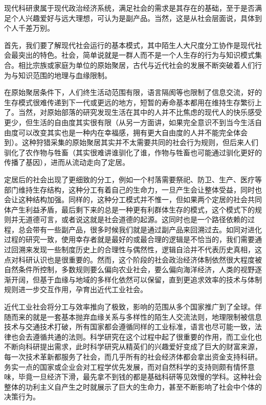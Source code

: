 \documentclass[]{tufte-book}
\begin{document}
现代科研隶属于现代政治经济系统，满足社会的需求是其存在的基础，至于是否满足个人兴趣爱好与远大理想，可认为是副产品。当然，这是从社会层面说，具体到个人千差万别。

首先，我们要了解现代社会运行的基本模式，其中陌生人大尺度分工协作是现代社会最突出的特色。社会，简单说就是一群人而不是一个人生存的行为与知识模式集合。相比宗族或家庭为单位的原始聚居，古代与近代社会的发展不断突破着人们行为与知识范围的地理与血缘限制。

在原始聚居条件下，人们终生活动范围有限，语言隔阂等也限制了信息交流，好的生存模式很难传递到下一代或更远的地方，短暂的寿命基本都用在维持生存繁衍上了。当然，对原始部落的研究发现生活在其中的人并不比焦虑的现代人的快乐感受更少，但生活的自由度其实很有限（从另一方面讲，如果完全意识不到当今生活自由度可以改变其实也是一种内在幸福感，拥有更大自由度的人并不能完全体会到）。这种狩猎采集的原始聚居其实并不太需要共同的社会行为规则，但后来人们驯化了农作物与牲畜（其实很难讲谁驯化了谁，作物与牲畜也可能通过驯化更好的传播了基因），进而从流动走向了定居。

定居后的社会出现了更细致的分工，例如一个村落需要祭祀、防卫、生产、医疗等部门维持生存结构，这种分工有着自己的生命力，一旦产生会让整体受益，同时也会让这种结构加强。同样的，这种分工模式并不惟一，但如果两个定居的社会共同体产生利益矛盾，最后剩下来的总是一种更有利群体生存的模式，这个模式下的规则并无道德可言，或者说这就是社会道德的起源。这同时也是一个路径依赖的过程，总会带有一些副产品，很多时候我们就是通过副产品来回溯过去。如同对进化过程的研究一致，使用幸存者就是最好的或最合理的逻辑是不恰当的，我们需要通过回溯来发现一些制度历史上的合理性与偶然性，逻辑自洽并不代表历史真相，这点对科研认识也是很重要的。然而，这个阶段的社会政治经济体制依然很大程度被自然条件所控制，多数规则要么偏向农业社会，要么偏向海洋经济，人类的视野逐渐开阔，但基于血缘与地域的多样化依然可以保留，直到更追求效率的技术与体制规则进一步交互作用，孕育出近代工业社会。

近代工业社会将分工与效率推向了极致，影响的范围从多个国家推广到了全球。伴随而来的就是一套基本抛弃血缘关系与多样性的陌生人交流法则，地理限制被信息技术与交通技术打破，所有国家都会遵循同样的工业标准，语言也尽可能一致，法律也会去遵循共通的法则。科学研究在这个过程中起了很重要的作用，而工业化也不断向科研提出需求，此时科学研究从精英们的兴趣爱好变成了巨大的财富来源，每一次技术革新都服务了社会，而几乎所有的社会经济体都会拿出资金支持科研。务实一点的国家或企业会对工程学优先发展，而对自然科学的支持则颇有情怀意味，毕竟一旦经济下滑，最先拿不到钱的都是基础科研等见效慢的学科。这种社会整体的功利主义自产生之时就展示了巨大的生命力，甚至不断影响了社会中个体的决策行为。
\end{document}
